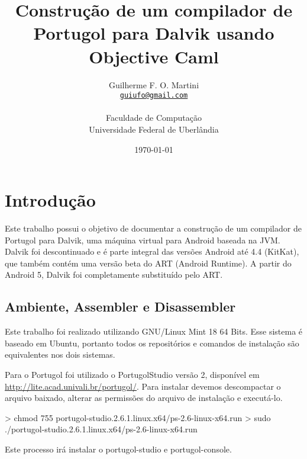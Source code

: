 \documentclass[12pt,a4paper,twoside]{report}
\title{Construção de um compilador de Portugol para Dalvik usando Objective Caml}
\date{}
\author{Guilherme F. O. Martini \\
\texttt{\small \url{guiufo@gmail.com}}\\
\vspace{1cm} \\
Faculdade de Computação \\
Universidade Federal de Uberlândia
}
\date{\today}
\begin{document}
  \maketitle
\listoffigures            
\listoftables            
\lstlistoflistings

\tableofcontents    


\fancyhead[RE,LO]{\thesection}

\setlength{\parskip}{0.15in} %

\chapter{Introdução}
Este trabalho possui o objetivo de documentar a construção de um compilador
de Portugol para Dalvik, uma máquina virtual para Android baseada na JVM.
Dalvik foi descontinuado e é parte integral das versões Android até 4.4 (KitKat),
que também contém uma versão beta do ART (Android Runtime).
A partir do Android 5, Dalvik foi completamente substituído pelo ART.
\section{Ambiente, Assembler e Disassembler}

Este trabalho foi realizado utilizando GNU/Linux Mint 18 64 Bits.
Esse sistema é baseado em Ubuntu, portanto todos os repositórios e comandos
de instalação são equivalentes nos dois sistemas.

Para o Portugol foi utilizado o PortugolStudio versão 2, disponível em
\url{http://lite.acad.univali.br/portugol/}. Para instalar devemos descompactar
o arquivo baixado, alterar as permissões do arquivo de instalação e executá-lo.

\begin{terminal}
> chmod 755 portugol-studio.2.6.1.linux.x64/ps-2.6-linux-x64.run
> sudo ./portugol-studio.2.6.1.linux.x64/ps-2.6-linux-x64.run
\end{terminal}

Este processo irá instalar o portugol-studio e portugol-console.
\end{document}
